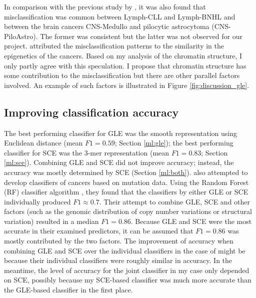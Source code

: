 In comparison with the previous study by \citet{Jiao2020}, it was also found that misclassification was common between Lymph-CLL and Lymph-BNHL and between the brain cancers CNS-Medullo and pilocytic astrocytoma (CNS-PiloAstro). The former was consistent but the latter was not observed for our project. \citet{Jiao2020} attributed the misclassification patterns to the similarity in the epigenetics of the cancers. Based on my analysis of the chromatin structure, I only partly agree with this speculation. I propose that chromatin structure has some contribution to the misclassification but there are other parallel factors involved. An example of such factors is illustrated in Figure \ref{fig:discussion_gle}.

\subsection{Improving classification accuracy}
The best performing classifier for GLE was the smooth representation using Euclidean distance (mean $F1=0.59$; Section \ref{ml:gle}); the best performing classifier for SCE was the 3-mer representation (mean $F1=0.83$; Section \ref{ml:sce}). Combining GLE and SCE did not improve accuracy; instead, the accuracy was mostly determined by SCE (Section \ref{ml:both}). \citet{Jiao2020} also attempted to develop classifiers of cancers based on mutation data. Using the Random Forest (RF) classifier algorithm \citep{Lindner2017AutomatedModels}, they found that the classifiers by either GLE or SCE individually produced $F1\approx0.7$. Their attempt to combine GLE, SCE and other factors (such as the genomic distribution of copy number variations or structural variation) resulted in a median $F1=0.86$. Because GLE and SCE were the most accurate in their examined predictors, it can be assumed that $F1=0.86$ was mostly contributed by the two factors. The improvement of accuracy when combining GLE and SCE over the individual classifiers in the case of \citet{Jiao2020} might be because their individual classifiers were roughly similar in accuracy. In the meantime, the level of accuracy for the joint classifier in my case only depended on SCE, possibly because my SCE-based classifier was much more accurate than the GLE-based classifier in the first place. 


